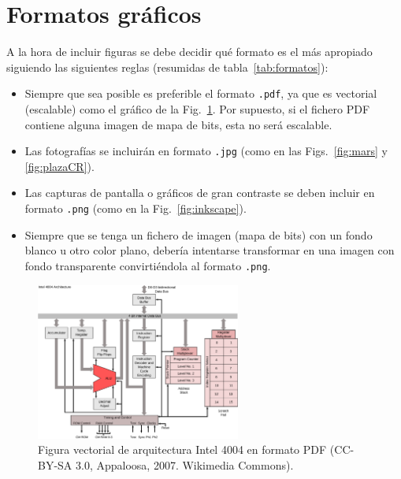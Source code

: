 \documentclass[11pt,a4paper]{article}
\begin{document}
\section{Formatos gráficos}
A la hora de incluir figuras se debe decidir qué formato es el más apropiado siguiendo las siguientes reglas (resumidas de tabla~\ref{tab:formatos}):
\begin{itemize}
	\item Siempre que sea posible es preferible el formato \texttt{.pdf}, ya que es vectorial (escalable) como el gráfico de la Fig.~\ref{fig:4004arch}. Por supuesto, si el fichero \textsf{PDF} contiene alguna imagen de mapa de bits, esta no será escalable.
	\item Las fotografías se incluirán en formato \texttt{.jpg} (como en las  Figs.~\ref{fig:mars} y \ref{fig:plazaCR}).
	\item Las capturas de pantalla o gráficos de gran contraste se deben incluir en formato \texttt{.png} (como en la Fig.~\ref{fig:inkscape}). 
	\item Siempre que se tenga un fichero de imagen (mapa de bits) con un fondo blanco u otro color plano, debería intentarse transformar en una imagen con fondo transparente convirtiéndola al formato \texttt{.png}.
\end{itemize}

\begin{figure}[hbt]
	\centering 
	\includegraphics[width=0.6\textwidth]{../figs/4004arch} 
	\caption[Ejemplo de gráfico vectorial \textsf{PDF}]{Figura vectorial de arquitectura Intel 4004 en formato \textsf{PDF} (CC-BY-SA 3.0, Appaloosa, 2007. Wikimedia Commons).}
	\label{fig:4004arch}
\end{figure}
\end{document}
